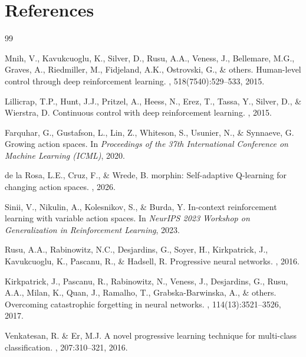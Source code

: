 \documentclass{article}
\begin{document}
\section*{References}
{\small
\begin{thebibliography}{99}

Mnih, V., Kavukcuoglu, K., Silver, D., Rusu, A.A., Veness, J., Bellemare,
M.G., Graves, A., Riedmiller, M., Fidjeland, A.K., Ostrovski, G., \& others.
\newblock Human-level control through deep reinforcement learning.
, 518(7540):529--533, 2015.

Lillicrap, T.P., Hunt, J.J., Pritzel, A., Heess, N., Erez, T., Tassa, Y.,
Silver, D., \& Wierstra, D.
\newblock Continuous control with deep reinforcement learning.
, 2015.

Farquhar, G., Gustafson, L., Lin, Z., Whiteson, S., Usunier, N., \& Synnaeve,
G.
\newblock Growing action spaces.
\newblock In {\it Proceedings of the 37th International Conference on Machine
  Learning (ICML)}, 2020.

de la Rosa, L.E., Cruz, F., \& Wrede, B.
\newblock morphin: Self-adaptive Q-learning for changing action spaces.
, 2026.

Sinii, V., Nikulin, A., Kolesnikov, S., \& Burda, Y.
\newblock In-context reinforcement learning with variable action spaces.
\newblock In {\it NeurIPS 2023 Workshop on Generalization in Reinforcement
  Learning}, 2023.

Rusu, A.A., Rabinowitz, N.C., Desjardins, G., Soyer, H., Kirkpatrick, J.,
Kavukcuoglu, K., Pascanu, R., \& Hadsell, R.
\newblock Progressive neural networks.
, 2016.

Kirkpatrick, J., Pascanu, R., Rabinowitz, N., Veness, J., Desjardins, G.,
Rusu, A.A., Milan, K., Quan, J., Ramalho, T., Grabska-Barwinska, A., \&
others.
\newblock Overcoming catastrophic forgetting in neural networks.
,
  114(13):3521--3526, 2017.

Venkatesan, R. \& Er, M.J.
\newblock A novel progressive learning technique for multi-class
classification.
, 207:310--321, 2016.


\end{thebibliography}}
\end{document}
